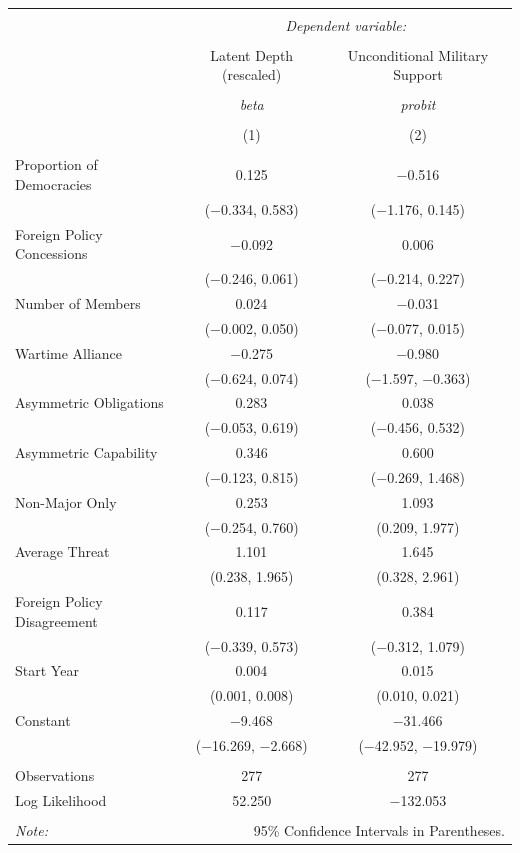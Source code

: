 \documentclass[12pt]{article}
\begin{document}
\begin{table}[!htbp] \centering 
  \caption{} 
  \label{tab:separate-models-prop} 
\begin{tabular}{@{\extracolsep{5pt}}lcc} 
\\[-1.8ex]\hline 
\hline \\[-1.8ex] 
 & \multicolumn{2}{c}{\textit{Dependent variable:}} \\ 
\cline{2-3} 
\\[-1.8ex] & Latent Depth (rescaled) & Unconditional Military Support \\ 
\\[-1.8ex] & \textit{beta} & \textit{probit} \\ 
\\[-1.8ex] & (1) & (2)\\ 
\hline \\[-1.8ex] 
 Proportion of Democracies & 0.125 & $-$0.516 \\ 
  & ($-$0.334, 0.583) & ($-$1.176, 0.145) \\ 
  Foreign Policy Concessions & $-$0.092 & 0.006 \\ 
  & ($-$0.246, 0.061) & ($-$0.214, 0.227) \\ 
  Number of Members & 0.024$^{}$ & $-$0.031 \\ 
  & ($-$0.002, 0.050) & ($-$0.077, 0.015) \\ 
  Wartime Alliance & $-$0.275 & $-$0.980$^{}$ \\ 
  & ($-$0.624, 0.074) & ($-$1.597, $-$0.363) \\ 
  Asymmetric Obligations & 0.283$^{}$ & 0.038 \\ 
  & ($-$0.053, 0.619) & ($-$0.456, 0.532) \\ 
  Asymmetric Capability & 0.346 & 0.600 \\ 
  & ($-$0.123, 0.815) & ($-$0.269, 1.468) \\ 
  Non-Major Only & 0.253 & 1.093$^{}$ \\ 
  & ($-$0.254, 0.760) & (0.209, 1.977) \\ 
  Average Threat & 1.101$^{}$ & 1.645$^{}$ \\ 
  & (0.238, 1.965) & (0.328, 2.961) \\ 
  Foreign Policy Disagreement & 0.117 & 0.384 \\ 
  & ($-$0.339, 0.573) & ($-$0.312, 1.079) \\ 
  Start Year & 0.004$^{}$ & 0.015$^{}$ \\ 
  & (0.001, 0.008) & (0.010, 0.021) \\ 
  Constant & $-$9.468$^{}$ & $-$31.466$^{}$ \\ 
  & ($-$16.269, $-$2.668) & ($-$42.952, $-$19.979) \\ 
 \hline \\[-1.8ex] 
Observations & 277 & 277 \\ 
Log Likelihood & 52.250 & $-$132.053 \\ 
\hline 
\hline \\[-1.8ex] 
\textit{Note:}  & \multicolumn{2}{r}{95\% Confidence Intervals in Parentheses.} \\ 
\end{tabular} 
\end{table} 
\end{document}
